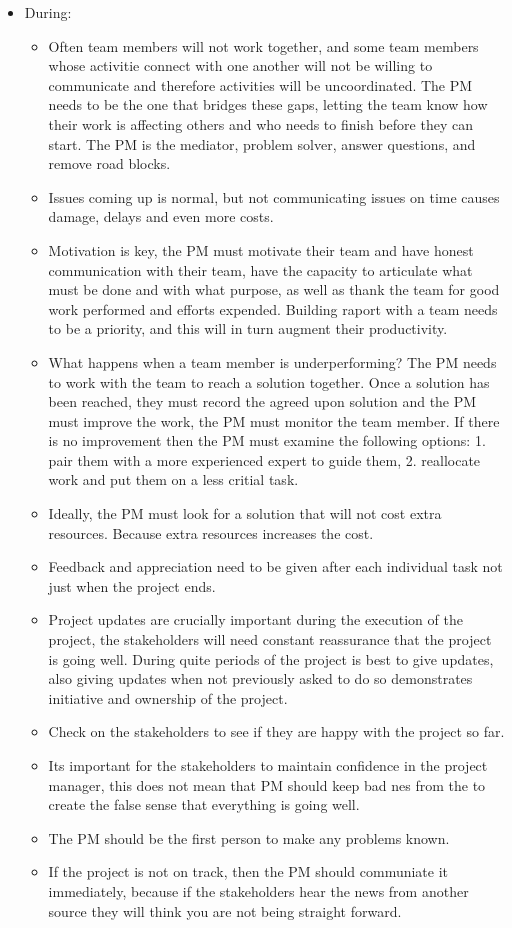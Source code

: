 \begin{itemize}
    \item During:
        \begin{itemize}
            \item Often team members will not work together, and some team members whose activitie connect with one another will not be willing to communicate and therefore activities will be uncoordinated. The PM needs to be the one that bridges these gaps, letting the team know how their work is affecting others and who needs to finish before they can start. The PM is the mediator, problem solver, answer questions, and remove road blocks.
            \item Issues coming up is normal, but not communicating issues on time causes damage, delays and even more costs.
            \item Motivation is key, the PM must motivate their team and have honest communication with their team, have the capacity to articulate what must be done and with what purpose, as well as thank the team for good work performed and efforts expended. Building raport with a team needs to be a priority, and this will in turn augment their productivity.
            \item What happens when a team member is underperforming? The PM needs to work with the team to reach a solution together. Once a solution has been reached, they must record the agreed upon solution and the PM must improve the work, the PM must monitor the team member. If there is no improvement then the PM must examine the following options: 1. pair them with a more experienced expert to guide them, 2. reallocate work and put them on a less critial task. 
            \item Ideally, the PM must look for a solution that will not cost extra resources. Because extra resources increases the cost.
            \item Feedback and appreciation need to be given after each individual task not just when the project ends.
            \item Project updates are crucially important during the execution of the project, the stakeholders will need constant reassurance that the project is going well. During quite periods of the project is best to give updates, also giving updates when not previously asked to do so demonstrates initiative and ownership of the project.
            \item Check on the stakeholders to see if they are happy with the project so far.
            \item Its important for the stakeholders to maintain confidence in the project manager, this does not mean that PM should keep bad nes from the to create the false sense that everything is going well.
            \item The PM should be the first person to make any problems known.
            \item If the project is not on track, then the PM should communiate it immediately, because if the stakeholders hear the news from another source they will think you are not being straight forward.
        \end{itemize}
        

\end{itemize}
